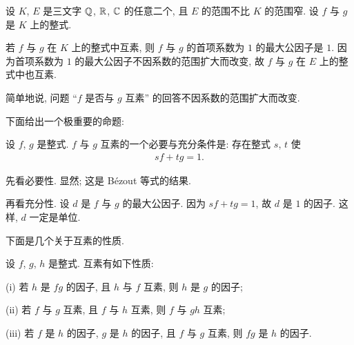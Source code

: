 \begin{proposition}
    设 $K$, $E$ 是三文字 $\mathbb{Q}$, $\mathbb{R}$, $\mathbb{C}$ 的任意二个, 且 $E$ 的范围不比 $K$ 的范围窄. 设 $f$ 与 $g$ 是 $K$ 上的整式.

    若 $f$ 与 $g$ 在 $K$ 上的整式中互素, 则 $f$ 与 $g$ 的首项系数为 $1$ 的最大公因子是 $1$. 因为首项系数为 $1$ 的最大公因子不因系数的范围扩大而改变, 故 $f$ 与 $g$ 在 $E$ 上的整式中也互素.

    简单地说, 问题 ``$f$ 是否与 $g$ 互素'' 的回答不因系数的范围扩大而改变.
\end{proposition}

下面给出一个极重要的命题:
\begin{proposition}
    设 $f$, $g$ 是整式. $f$ 与 $g$ 互素的一个必要与充分条件是: 存在整式 $s$, $t$ 使
    \begin{align*}
        sf + tg = 1.
    \end{align*}
\end{proposition}

\begin{pf}
    先看必要性. 显然; 这是 Bézout 等式的结果.

    再看充分性. 设 $d$ 是 $f$ 与 $g$ 的最大公因子. 因为 $sf + tg = 1$, 故 $d$ 是 $1$ 的因子. 这样, $d$ 一定是单位.
\end{pf}

下面是几个关于互素的性质.

\begin{proposition}
    设 $f$, $g$, $h$ 是整式. 互素有如下性质:

    (i) 若 $h$ 是 $fg$ 的因子, 且 $h$ 与 $f$ 互素, 则 $h$ 是 $g$ 的因子;

    (ii) 若 $f$ 与 $g$ 互素, 且 $f$ 与 $h$ 互素, 则 $f$ 与 $gh$ 互素;

    (iii) 若 $f$ 是 $h$ 的因子, $g$ 是 $h$ 的因子, 且 $f$ 与 $g$ 互素, 则 $fg$ 是 $h$ 的因子.
\end{proposition}

